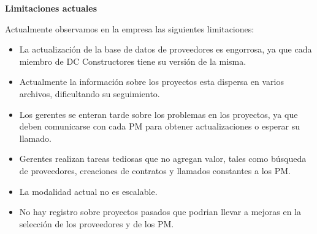 \textbf{Limitaciones actuales}

Actualmente observamos en la empresa las siguientes limitaciones:
\begin{itemize}
    \item La actualización de la base de datos de proveedores es engorrosa, ya que cada miembro de DC Constructores tiene su versión de la misma.
    \item Actualmente la información sobre los proyectos esta dispersa en varios archivos, dificultando su seguimiento.
    \item Los gerentes se enteran tarde sobre los problemas en los proyectos, ya que deben comunicarse con cada PM para obtener actualizaciones o esperar su llamado.
    \item Gerentes realizan tareas tediosas que no agregan valor, tales como búsqueda de proveedores, creaciones de contratos y llamados constantes a los PM.
    \item La modalidad actual no es escalable.
    \item No hay registro sobre proyectos pasados que podrian llevar a mejoras en la selección de los proveedores y de los PM.
\end{itemize}





